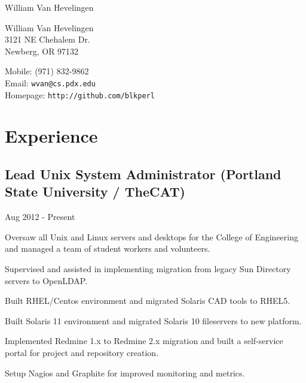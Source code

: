 \documentclass[10pt,letterpaper]{article}
\def\name{William Van Hevelingen}
\renewenvironment{itemize}{
  \begin{list}{}{
    \setlength{\leftmargin}{1.5em}
    \setlength{\itemsep}{0.25em}
    \setlength{\parskip}{0pt}
    \setlength{\parsep}{0.25em}
  }
}{
  \end{list}
}
\begin{document}
{\huge \name}


\vspace{0.25in}

\begin{minipage}[t]{0.5\textwidth}
  William Van Hevelingen\\
  3121 NE Chehalem Dr.\\
  Newberg, OR 97132
\end{minipage}
\begin{minipage}[t]{0.5\textwidth}
  Mobile: (971) 832-9862 \\
  Email: \texttt{wvan@cs.pdx.edu} \\
  Homepage: \texttt{http://github.com/blkperl} \\
\end{minipage}


\section*{Experience}

\subsection*{Lead Unix System Administrator (Portland State University / TheCAT)}

\begin{itemize}
    \item Aug 2012 - Present
    \item Oversaw all Unix and Linux servers and desktops for the College of Engineering and managed a team of student workers and volunteers.
    \item Supervised and assisted in implementing migration from legacy Sun Directory servers to OpenLDAP.
    \item Built RHEL/Centos environment and migrated Solaris CAD tools to RHEL5.
    \item Built Solaris 11 environment and migrated Solaris 10 fileservers to new platform.
    \item Implemented Redmine 1.x to Redmine 2.x migration and built a self-service portal for project and repository creation.
    \item Setup Nagios and Graphite for improved monitoring and metrics.
\end{itemize}
\end{document}
